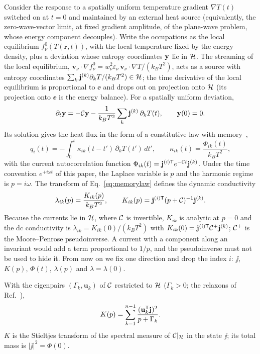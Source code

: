 Consider the response to a spatially uniform temperature gradient $\nabla T(t)$ switched on at $t=0$
and maintained by an external heat source (equivalently, the zero-wave-vector limit, at fixed gradient
amplitude, of the plane-wave problem, whose energy component decouples). Write the occupations as the
local equilibrium $f^0_\nu(T(\mathbf r,t))$,
with the local temperature fixed by the energy density, plus a deviation whose entropy coordinates
$\mathbf y$ lie in $\mathcal H$. The streaming of the local equilibrium,
$\mathbf v_\nu\cdot\nabla f^0_\nu=w_\nu^2\varepsilon_\nu\,\mathbf v_\nu\cdot\nabla T/(k_BT^2)$, acts as a
source with entropy coordinates $\sum_k\mathbf j^{(k)}\partial_kT/(k_BT^2)\in\mathcal H$; the time derivative of the
local equilibrium is proportional to $\ee$ and drops out on projection onto $\mathcal H$ (its projection onto
$\ee$ is the energy balance). For a spatially uniform deviation,
\begin{equation}
\partial_t\mathbf y=-\mathcal C\mathbf y-\frac{1}{k_BT^2}\sum_k\mathbf j^{(k)}\,\partial_kT(t),\qquad \mathbf y(0)=0.
\label{eq:drive}
\end{equation}
Its solution gives the heat flux in the form of a constitutive law with memory~\cite{GurtinPipkin1968},
\begin{equation}
q_i(t)=-\int_0^t\kappa_{ik}(t-t')\,\partial_kT(t')\,dt',\qquad
\kappa_{ik}(t)=\frac{\Phi_{ik}(t)}{k_BT^2},
\label{eq:memorylaw}
\end{equation}
with the current autocorrelation function $\Phi_{ik}(t)=\mathbf j^{(i)\mathsf T}e^{-\mathcal C t}\mathbf j^{(k)}$. Under the
time convention $e^{+i\omega t}$ of this paper, the Laplace variable is $p$ and the harmonic regime is
$p=i\omega$. The transform of Eq.~\eqref{eq:memorylaw} defines the dynamic conductivity
\begin{equation}
\lambda_{ik}(p)=\frac{K_{ik}(p)}{k_BT^2},\qquad K_{ik}(p)=\mathbf j^{(i)\mathsf T}(p+\mathcal C)^{-1}\mathbf j^{(k)}.
\label{eq:dynamicK}
\end{equation}
Because the currents lie in $\mathcal H$, where $\mathcal C$ is invertible, $K_{ik}$ is analytic at $p=0$ and the
dc conductivity is $\lambda_{ik}=K_{ik}(0)/(k_BT^2)$ with $K_{ik}(0)=\mathbf j^{(i)\mathsf T}\mathcal C^+\mathbf j^{(k)}$;
$\mathcal C^+$ is the Moore--Penrose pseudoinverse. A current with a component along an invariant would add a
term proportional to $1/p$, and the pseudoinverse must not be used to hide it. From now on we fix one
direction and drop the index $i$: $\jj$, $K(p)$, $\Phi(t)$, $\lambda(p)$ and $\lambda=\lambda(0)$.

With the eigenpairs $(\Gamma_k,\mathbf u_k)$ of $\mathcal C$ restricted to $\mathcal H$ ($\Gamma_k>0$; the relaxons
of Ref.~\cite{CepellottiMarzari2016}),
\begin{equation}
K(p)=\sum_{k=1}^{n-1}\frac{(\mathbf u_k^{\mathsf T}\mathbf j)^2}{p+\Gamma_k}.
\label{eq:stieltjes}
\end{equation}
$K$ is the Stieltjes transform of the spectral measure of $\mathcal C|_{\mathcal H}$ in the state $\jj$; its total
mass is $|\jj|^2=\Phi(0)$.

